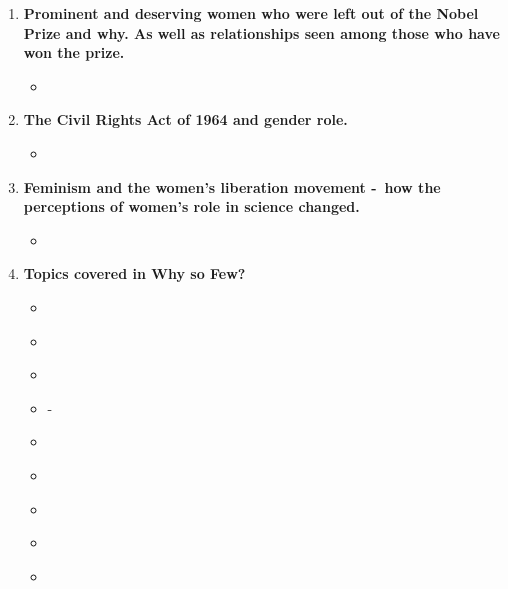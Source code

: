 \documentclass[12pt,a4paper]{article}
\begin{document}
\begin{enumerate}
\begin{itemize}
    \end{itemize}
    \item \textbf{Prominent and deserving women who were left out of the Nobel Prize and why. As well as relationships seen among those who have won the prize.}
    \begin{itemize}
      \item[]
    \end{itemize}
    \item \textbf{The Civil Rights Act of 1964 and gender role.}
    \begin{itemize}
      \item[] 
    \end{itemize}
    \item \textbf{Feminism and the women’s liberation movement -\ how the perceptions of women's role in science changed.}
    \begin{itemize}
      \item[] 
    \end{itemize}
    \item \textbf{Topics covered in Why so Few?}
    \begin{itemize} 
      \item \href{https://www.cbs.com/shows/60_minutes/video/YPhAPrmoPNXU6EEPdRzkbcRP7oM_1RuR/grace-hopper-she-taught-computers-to-talk/}{}
      \item \href{https://www.youtube.com/watch?v=01ZrwW9C5z0}{}
      \item {}
      \item {} -\ 
      \item {}
      \item \href{https://www.npr.org/sections/money/2014/10/21/357629765/when-women-stopped-coding}{}
      \item \href{https://www.theverge.com/2017/8/16/16153740/tech-diversity-problem-science-history-explainer-inequality}{}
      \item \href{https://www.aauw.org/resources/research/the-stem-gap/}{} %
      \item {} \href{https://www.youtube.com/watch?v=QgUVrzkQgds&feature=youtu.be}{}

\end{itemize}
\end{enumerate}
\end{document}
